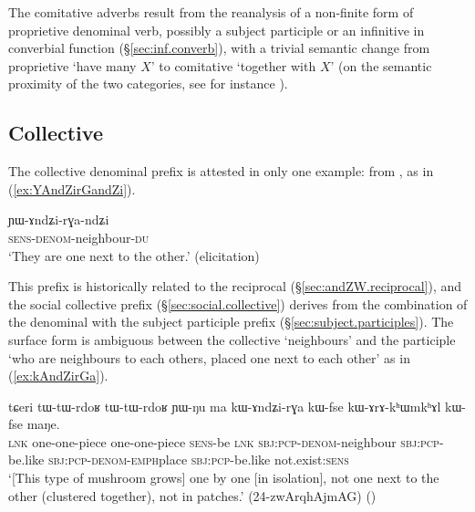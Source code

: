 The comitative adverbs result from the reanalysis of a non-finite form of proprietive  denominal verb, possibly a subject participle or an infinitive in converbial function (§\ref{sec:inf.converb}), with a trivial semantic change from proprietive `have many $X$' to comitative `together with $X$' (on the semantic proximity of the two categories, see for instance \citealt{sutton76having, patz91djabugay, stassen00and, stolz06comitative, arkhipov09comitative}).
 

\subsection{Collective  } \label{sec:denom.andZi}
The  collective denominal prefix is attested in only one example: 
 from , as in (\ref{ex:YAndZirGandZi}). 

\begin{exe}
\ex \label{ex:YAndZirGandZi}
\gll ɲɯ-ɤndʑi-rɣa-ndʑi \\
\textsc{sens}-\textsc{denom}-neighbour-\textsc{du} \\
\glt `They are one next to the other.' (elicitation)
\end{exe}

This prefix is historically related to the  reciprocal (§\ref{sec:andZW.reciprocal}), and the social collective  prefix (§\ref{sec:social.collective}) derives from the combination of the denominal  with the  subject participle prefix (§\ref{sec:subject.participles}). The surface form  is ambiguous between the collective `neighbours' and the participle `who are neighbours to each others, placed one next to each other' as in (\ref{ex:kAndZirGa}).


\begin{exe}
\ex \label{ex:kAndZirGa}
\gll  tɕeri tɯ-tɯ-rdoʁ tɯ-tɯ-rdoʁ ɲɯ-ŋu ma kɯ-ɤndʑi-rɣa kɯ-fse kɯ-ɤrɤ-kʰɯm\redp{}kʰɤl kɯ-fse maŋe. \\
\textsc{lnk} one-one-piece one-one-piece  \textsc{sens}-be \textsc{lnk} \textsc{sbj}:\textsc{pcp}-\textsc{denom}-neighbour \textsc{sbj}:\textsc{pcp}-be.like \textsc{sbj}:\textsc{pcp}-\textsc{denom}-\textsc{emph}\redp{}place  \textsc{sbj}:\textsc{pcp}-be.like not.exist:\textsc{sens} \\
\glt `[This type of mushroom grows] one by one [in isolation], not one next to the other (clustered together), not in patches.' (24-zwArqhAjmAG) ()
\end{exe}

